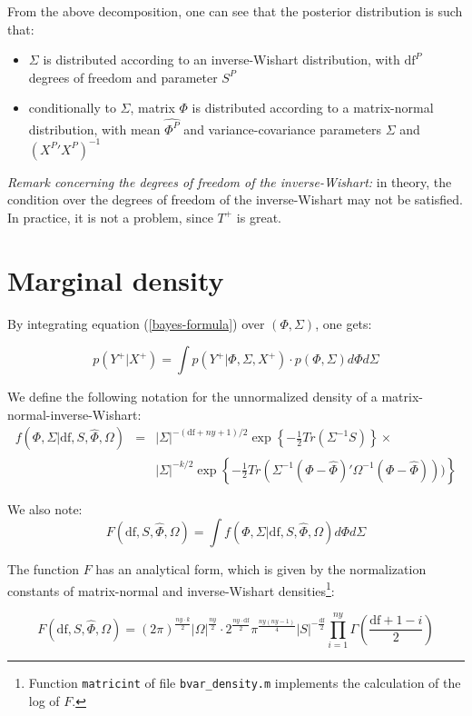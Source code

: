 \documentclass[10pt,a4paper]{article}
\newcommand{\df}{\text{df}}
\begin{document}
From the above decomposition, one can see that the posterior distribution is such that:
\begin{itemize}
\item $\Sigma$ is distributed according to an inverse-Wishart distribution, with $\df^P$ degrees of freedom and parameter $S^P$
\item conditionally to $\Sigma$, matrix $\Phi$ is distributed according to a matrix-normal distribution, with mean $\hat{\Phi^P}$ and variance-covariance parameters $\Sigma$ and $({X^P}'X^P)^{-1}$
\end{itemize}

\emph{Remark concerning the degrees of freedom of the inverse-Wishart:} in theory, the condition over the degrees of freedom of the inverse-Wishart may not be satisfied. In practice, it is not a problem, since $T^+$ is great.

\section{Marginal density}

By integrating equation (\ref{bayes-formula}) over $(\Phi, \Sigma)$, one gets:

$$p(Y^+ | X^+) = \int p(Y^+ | \Phi, \Sigma, X^+) \cdot p(\Phi, \Sigma) d\Phi d\Sigma$$

We define the following notation for the unnormalized density of a matrix-normal-inverse-Wishart:
\begin{eqnarray*}
f(\Phi,\Sigma | \df,S,\hat{\Phi},\Omega) & = & |\Sigma|^{-(\df + ny + 1)/2} \exp\left\{-\frac{1}{2}Tr(\Sigma^{-1}S)\right\} \times \\
& & |\Sigma|^{-k/2}\exp\left\{-\frac{1}{2}Tr(\Sigma^{-1}(\Phi-\hat{\Phi})'\Omega^{-1}(\Phi-\hat{\Phi})))\right\}
\end{eqnarray*}

We also note:
$$F(\df,S,\hat{\Phi},\Omega) = \int f(\Phi,\Sigma | \df,S,\hat{\Phi},\Omega)d\Phi d\Sigma$$

The function $F$ has an analytical form, which is given by the normalization constants of matrix-normal and inverse-Wishart densities\footnote{Function \texttt{matricint} of file \texttt{bvar\_density.m} implements the calculation of the log of $F$.}:

$$F(\df,S,\hat{\Phi},\Omega) = (2\pi)^{\frac{ny\cdot k}{2}} |\Omega|^{\frac{ny}{2}} \cdot 2^{\frac{ny\cdot \df}{2}} \pi^{\frac{ny(ny-1)}{4}} |S|^{-\frac{\df}{2}} \prod_{i=1}^{ny} \Gamma\left(\frac{\df + 1 - i}{2}\right) $$
\end{document}
